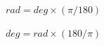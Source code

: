 \documentclass{article}
\begin{document}
$ rad = deg \times (\pi / 180) $
\pagebreak

$ deg = rad \times (180 / \pi) $
\pagebreak
\end{document}
